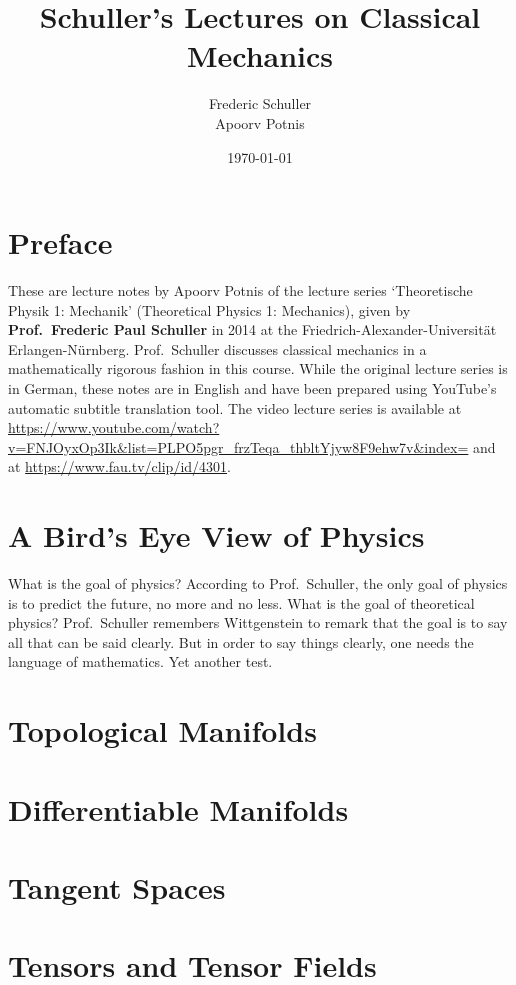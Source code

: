 \documentclass[a4 paper, oneside, 12pt]{book}
\title{Schuller's Lectures on Classical Mechanics}
\author{Frederic Schuller\\Apoorv Potnis}
\date{\today}
\theoremstyle{definition}
\begin{document}
	\hypertarget{TitlePage}{}
	\maketitle

	\chapter*{Preface}
	\hypertarget{Preface}{}
	These are lecture notes by Apoorv Potnis of the lecture series `Theoretische Physik 1: Mechanik' (Theoretical Physics 1: Mechanics), given by \textbf{Prof.\ Frederic Paul Schuller} in 2014 at the Friedrich-Alexander-Universität Erlangen-Nürnberg. Prof.\ Schuller discusses classical mechanics in a mathematically rigorous fashion in this course. While the original lecture series is in German, these notes are in English and have been prepared using YouTube's automatic subtitle translation tool. The video lecture series is available at \url{https://www.youtube.com/watch?v=FNJOyxOp3Ik&list=PLPO5pgr_frzTeqa_thbltYjyw8F9ehw7v&index=} and at \url{https://www.fau.tv/clip/id/4301}.
	\clearpage

	\hypertarget{Contents}{}
	\tableofcontents

	\chapter{A Bird's Eye View of Physics}

	What is the goal of physics? According to Prof.\ Schuller, the only goal of physics is to predict the future, no more and no less. What is the goal of theoretical physics? Prof.\ Schuller remembers Wittgenstein to remark that the goal is to say all that can be said clearly. But in order to say things clearly, one needs the language of mathematics. Yet another test.

	\chapter{Topological Manifolds}

	\chapter{Differentiable Manifolds}

	\chapter{Tangent Spaces}

	\chapter{Tensors and Tensor Fields}

	\nocite{*}
	\printbibliography[heading=bibintoc]
	\printindex
\end{document}
